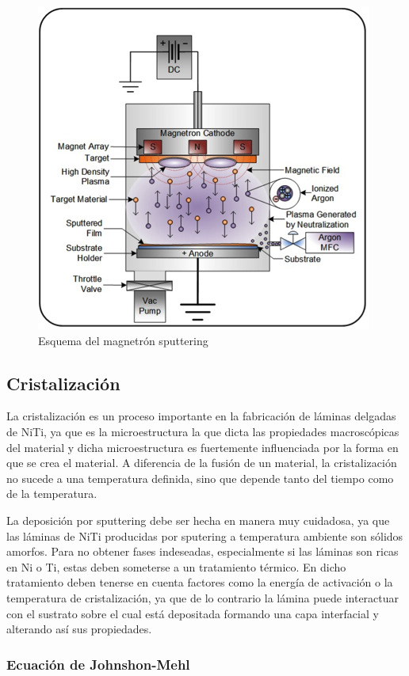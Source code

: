 \documentclass{article}
\theoremstyle{definition}
\theoremstyle{remark}
\begin{document}
\begin{figure}[H]
	\centering
	\includegraphics[scale=0.8]{img/diagram-dc-magnatron.png}
	\caption{Esquema del magnetrón sputtering}
	\label{sputter}
\end{figure}

\subsection{Cristalización}

La cristalización es un proceso importante en la fabricación de láminas delgadas de NiTi, ya que es la microestructura la que dicta las propiedades macroscópicas del material y dicha microestructura es fuertemente influenciada por la forma en que se crea el material. A diferencia de la fusión de un material, la cristalización no sucede a una temperatura definida, sino que depende tanto del tiempo como de la temperatura.

La deposición por sputtering debe ser hecha en manera muy cuidadosa, ya que las láminas de NiTi producidas por sputering a temperatura ambiente son sólidos amorfos. Para no obtener fases indeseadas, especialmente si las láminas son ricas en Ni o Ti, estas deben someterse a un tratamiento térmico. En dicho tratamiento deben tenerse en cuenta factores como la energía de activación o la temperatura de cristalización, ya que de lo contrario la lámina puede interactuar con el sustrato sobre el cual está depositada formando una capa interfacial y alterando así sus propiedades.

\subsubsection{Ecuación de Johnshon-Mehl}
\end{document}
